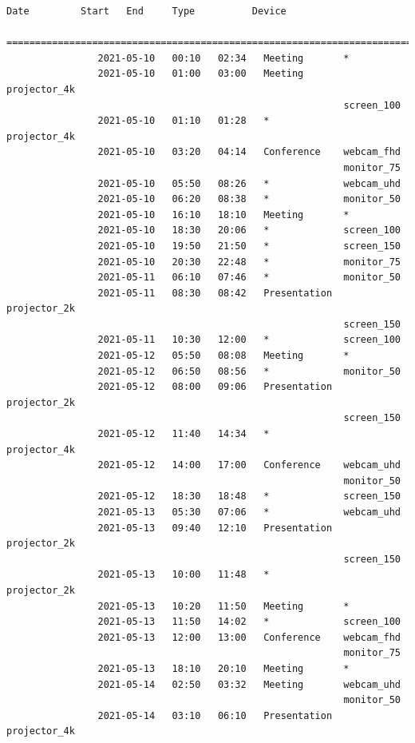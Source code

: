 \documentclass{article}
\begin{document}
\begin{Verbatim}[gobble=8]
                Date         Start   End     Type          Device
                ===========================================================================
                2021-05-10   00:10   02:34   Meeting       *
                2021-05-10   01:00   03:00   Meeting       projector_4k
                                                           screen_100
                2021-05-10   01:10   01:28   *             projector_4k
                2021-05-10   03:20   04:14   Conference    webcam_fhd
                                                           monitor_75
                2021-05-10   05:50   08:26   *             webcam_uhd
                2021-05-10   06:20   08:38   *             monitor_50
                2021-05-10   16:10   18:10   Meeting       *
                2021-05-10   18:30   20:06   *             screen_100
                2021-05-10   19:50   21:50   *             screen_150
                2021-05-10   20:30   22:48   *             monitor_75
                2021-05-11   06:10   07:46   *             monitor_50
                2021-05-11   08:30   08:42   Presentation  projector_2k
                                                           screen_150
                2021-05-11   10:30   12:00   *             screen_100
                2021-05-12   05:50   08:08   Meeting       *
                2021-05-12   06:50   08:56   *             monitor_50
                2021-05-12   08:00   09:06   Presentation  projector_2k
                                                           screen_150
                2021-05-12   11:40   14:34   *             projector_4k
                2021-05-12   14:00   17:00   Conference    webcam_uhd
                                                           monitor_50
                2021-05-12   18:30   18:48   *             screen_150
                2021-05-13   05:30   07:06   *             webcam_uhd
                2021-05-13   09:40   12:10   Presentation  projector_2k
                                                           screen_150
                2021-05-13   10:00   11:48   *             projector_2k
                2021-05-13   10:20   11:50   Meeting       *
                2021-05-13   11:50   14:02   *             screen_100
                2021-05-13   12:00   13:00   Conference    webcam_fhd
                                                           monitor_75
                2021-05-13   18:10   20:10   Meeting       *
                2021-05-14   02:50   03:32   Meeting       webcam_uhd
                                                           monitor_50
                2021-05-14   03:10   06:10   Presentation  projector_4k

\end{Verbatim}
\end{document}
